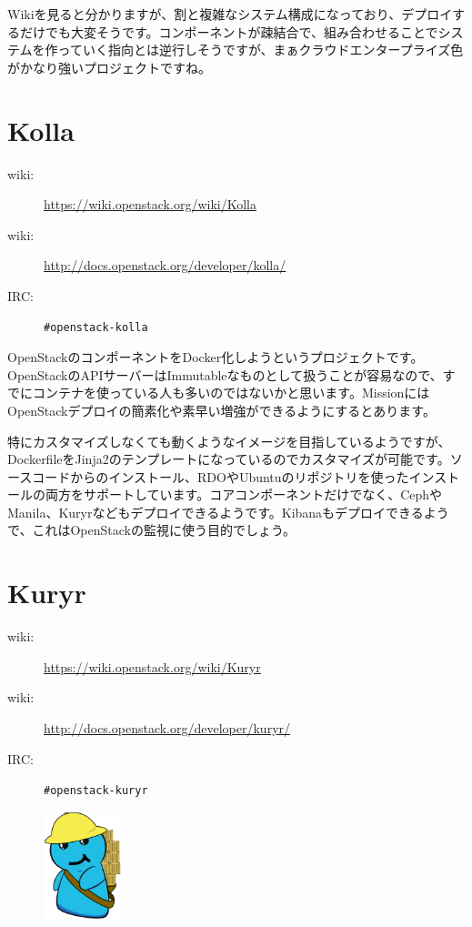 Wikiを見ると分かりますが、割と複雑なシステム構成になっており、デプロイするだけでも大変そうです。コンポーネントが疎結合で、組み合わせることでシステムを作っていく指向とは逆行しそうですが、まぁクラウドエンタープライズ色がかなり強いプロジェクトですね。

\section{Kolla}

\begin{description}
	\item[wiki:] \url{https://wiki.openstack.org/wiki/Kolla}
	\item[wiki:] \url{http://docs.openstack.org/developer/kolla/}
	\item[IRC:] \verb|#openstack-kolla|
\end{description}

OpenStackのコンポーネントをDocker化しようというプロジェクトです。OpenStackのAPIサーバーはImmutableなものとして扱うことが容易なので、すでにコンテナを使っている人も多いのではないかと思います。MissionにはOpenStackデプロイの簡素化や素早い増強ができるようにするとあります。

特にカスタマイズしなくても動くようなイメージを目指しているようですが、DockerfileをJinja2のテンプレートになっているのでカスタマイズが可能です。ソースコードからのインストール、RDOやUbuntuのリポジトリを使ったインストールの両方をサポートしています。コアコンポーネントだけでなく、CephやManila、Kuryrなどもデプロイできるようです。Kibanaもデプロイできるようで、これはOpenStackの監視に使う目的でしょう。

\section{Kuryr}

\begin{description}
	\item[wiki:] \url{https://wiki.openstack.org/wiki/Kuryr}
	\item[wiki:] \url{http://docs.openstack.org/developer/kuryr/}
	\item[IRC:] \verb|#openstack-kuryr|
\end{description}

\begin{figure}
	\begin{center}
		\includegraphics[width=0.2\textwidth]{img/kuryr_logo.png}
	\end{center}
\end{figure}

